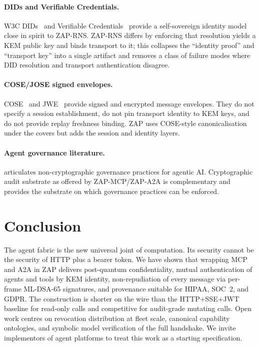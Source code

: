 \documentclass[11pt,a4paper]{article}
\theoremstyle{definition}
\theoremstyle{remark}
\newcommand{\zap}{\textsf{ZAP}\xspace}
\newcommand{\zapmcp}{\textsf{ZAP-MCP}\xspace}
\newcommand{\zapaa}{\textsf{ZAP-A2A}\xspace}
\newcommand{\mcp}{\textsf{MCP}\xspace}
\newcommand{\aatwo}{\textsf{A2A}\xspace}
\newcommand{\rns}{\textsf{ZAP-RNS}\xspace}
\begin{document}
\paragraph{DIDs and Verifiable Credentials.} W3C
DIDs~\cite{didcore,didweb,didkey} and Verifiable
Credentials~\cite{vc20} provide a self-sovereign identity model close
in spirit to \rns{}. \rns{} differs by enforcing that resolution
yields a KEM public key and binds transport to it; this collapses the
``identity proof'' and ``transport key'' into a single artifact and
removes a class of failure modes where DID resolution and transport
authentication disagree.

\paragraph{COSE/JOSE signed envelopes.} COSE~\cite{cose} and
JWE~\cite{jose} provide signed and encrypted message envelopes. They
do not specify a session establishment, do not pin transport identity
to KEM keys, and do not provide replay freshness binding.
\zap{} uses COSE-style canonicalisation under the covers but adds the
session and identity layers.

\paragraph{Agent governance literature.} \cite{agent_audit_2024}
articulates non-cryptographic governance practices for agentic AI.
Cryptographic audit substrate as offered by \zapmcp{}/\zapaa{} is
complementary and provides the substrate on which governance practices
can be enforced.

\section{Conclusion}

The agent fabric is the new universal joint of computation. Its
security cannot be the security of HTTP plus a bearer token. We have
shown that wrapping \mcp{} and \aatwo{} in \zap{} delivers
post-quantum confidentiality, mutual authentication of agents and
tools by KEM identity, non-repudiation of every message via per-frame
ML-DSA-65 signatures, and provenance suitable for HIPAA, SOC~2, and
GDPR. The construction is shorter on the wire than the HTTP+SSE+JWT
baseline for read-only calls and competitive for audit-grade mutating
calls. Open work centres on revocation distribution at fleet scale,
canonical capability ontologies, and symbolic model verification of
the full handshake. We invite implementors of agent platforms to treat
this work as a starting specification.



\end{document}
